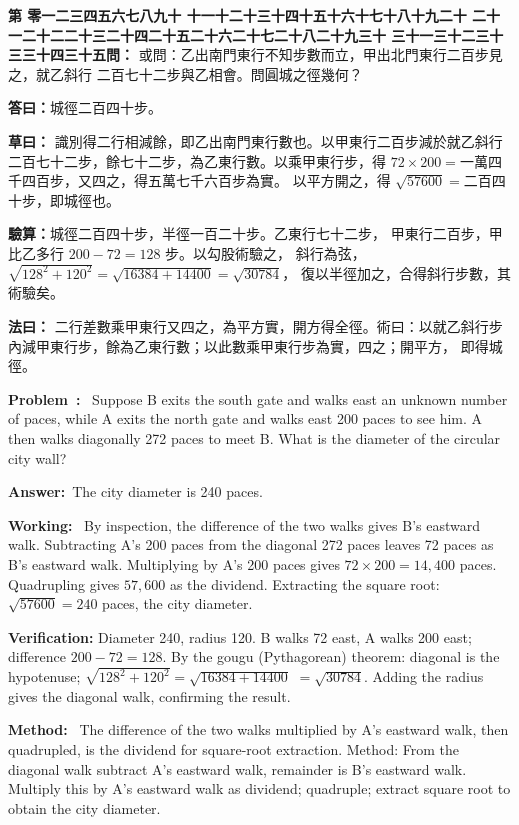 \documentclass[9pt,a4paper]{article}
\newcounter{probnum}
\newcounter{overallnum}
\newcommand{\chnum}[1]{%
  \ifcase#1 零\or 一\or 二\or 三\or 四\or 五\or 六\or 七\or 八\or 九\or 十\or
    十一\or 十二\or 十三\or 十四\or 十五\or 十六\or 十七\or 十八\or 十九\or 二十\or
    二十一\or 二十二\or 二十三\or 二十四\or 二十五\or 二十六\or 二十七\or 二十八\or 二十九\or 三十\or
    三十一\or 三十二\or 三十三\or 三十四\or 三十五\fi}
\newcommand{\problem}[1]{\stepcounter{probnum}\stepcounter{overallnum}\par\noindent\textbf{\color{volcolor}第\chnum{\value{probnum}}問：}#1\par\vspace{0.15cm}}
\newcommand{\answer}[1]{\par\noindent\textbf{答曰：}#1\par\vspace{0.15cm}}
\newcommand{\working}[1]{\par\noindent\textbf{草曰：}#1\par\vspace{0.15cm}}
\newcommand{\method}[1]{\par\noindent\textbf{法曰：}#1\par\vspace{0.25cm}}
\newcommand{\eproblem}[1]{\par\noindent\textbf{\color{volcolor}Problem~\theoverallnum:}~#1\par\vspace{0.15cm}}
\newcommand{\eanswer}[1]{\par\noindent\textbf{Answer:}~#1\par\vspace{0.15cm}}
\newcommand{\eworking}[1]{\par\noindent\textbf{Working:}~#1\par\vspace{0.15cm}}
\newcommand{\emethod}[1]{\par\noindent\textbf{Method:}~#1\par\vspace{0.25cm}}
\begin{document}
\noindent\begin{minipage}[t]{0.48\textwidth}
\problem{
或問：乙出南門東行不知步數而立，甲出北門東行二百步見之，就乙斜行
二百七十二步與乙相會。問圓城之徑幾何？
}

\answer{城徑二百四十步。}

\working{
識別得二行相減餘，即乙出南門東行數也。以甲東行二百步減於就乙斜行
二百七十二步，餘七十二步，為乙東行數。以乘甲東行步，得
$72 \times 200 ={}$一萬四千四百步，又四之，得五萬七千六百步為實。
以平方開之，得 $\sqrt{57600} ={}$二百四十步，即城徑也。

\textbf{驗算：}城徑二百四十步，半徑一百二十步。乙東行七十二步，
甲東行二百步，甲比乙多行 $200 - 72 = 128$ 步。以勾股術驗之，
斜行為弦，$\sqrt{128^2 + 120^2} = \sqrt{16384 + 14400} = \sqrt{30784}$，
復以半徑加之，合得斜行步數，其術驗矣。
}

\method{
二行差數乘甲東行又四之，為平方實，開方得全徑。術曰：以就乙斜行步
內減甲東行步，餘為乙東行數；以此數乘甲東行步為實，四之；開平方，
即得城徑。
}
\end{minipage}%
\hfill%
\begin{minipage}[t]{0.50\textwidth}
\eproblem{
Suppose B exits the south gate and walks east an unknown number of paces,
while A exits the north gate and walks east 200 paces to see him. A then
walks diagonally 272 paces to meet B. What is the diameter of the circular
city wall?
}

\eanswer{The city diameter is 240 paces.}

\eworking{
By inspection, the difference of the two walks gives B's eastward walk.
Subtracting A's 200 paces from the diagonal 272 paces leaves 72 paces
as B's eastward walk. Multiplying by A's 200 paces gives
$72 \times 200 = 14{,}400$ paces. Quadrupling gives $57{,}600$ as the dividend.
Extracting the square root: $\sqrt{57600} = 240$ paces, the city diameter.

\textbf{Verification:} Diameter 240, radius 120. B walks 72 east, A walks
200 east; difference $200 - 72 = 128$. By the gougu (Pythagorean) theorem:
diagonal is the hypotenuse; $\sqrt{128^2 + 120^2} = \sqrt{16384 + 14400}$
$= \sqrt{30784}$. Adding the radius gives the diagonal walk, confirming
the result.
}

\emethod{
The difference of the two walks multiplied by A's eastward walk,
then quadrupled, is the dividend for square-root extraction.
Method: From the diagonal walk subtract A's eastward walk, remainder is
B's eastward walk. Multiply this by A's eastward walk as dividend;
quadruple; extract square root to obtain the city diameter.
}
\end{minipage}
\vspace{0.15cm}
\end{document}
